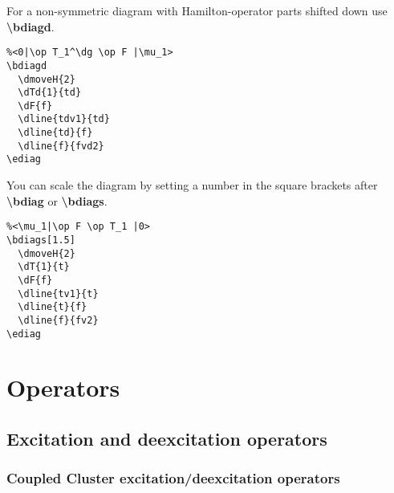 \documentclass[a4paper]{article}
\begin{document}
For a non-symmetric diagram with Hamilton-operator parts shifted down use {\bf \textbackslash bdiagd}.

 \begin{minipage}[b]{0.5\linewidth}\centering
  \begin{lstlisting}
%<0|\op T_1^\dg \op F |\mu_1>
\bdiagd
  \dmoveH{2}
  \dTd{1}{td}
  \dF{f}
  \dline{tdv1}{td}
  \dline{td}{f}
  \dline{f}{fvd2}
\ediag
  \end{lstlisting}
 \end{minipage}
 \begin{minipage}[b]{0.5\linewidth}\centering
    \bdiagd
    \ediag
 \end{minipage}

You can scale the diagram by setting a number in the square brackets after {\bf \textbackslash bdiag}
or {\bf \textbackslash bdiags}.

 \begin{minipage}[b]{0.5\linewidth}\centering
  \begin{lstlisting}
%<\mu_1|\op F \op T_1 |0>
\bdiags[1.5]
  \dmoveH{2}
  \dT{1}{t}
  \dF{f}
  \dline{tv1}{t}
  \dline{t}{f}
  \dline{f}{fv2}
\ediag 
  \end{lstlisting}
 \end{minipage}
 \begin{minipage}[b]{0.5\linewidth}\centering
    \bdiags[1.5]
    \ediag
 \end{minipage}


\section{Operators}

\subsection{Excitation and deexcitation operators}

\subsubsection{Coupled Cluster excitation/deexcitation operators}
\end{document}
